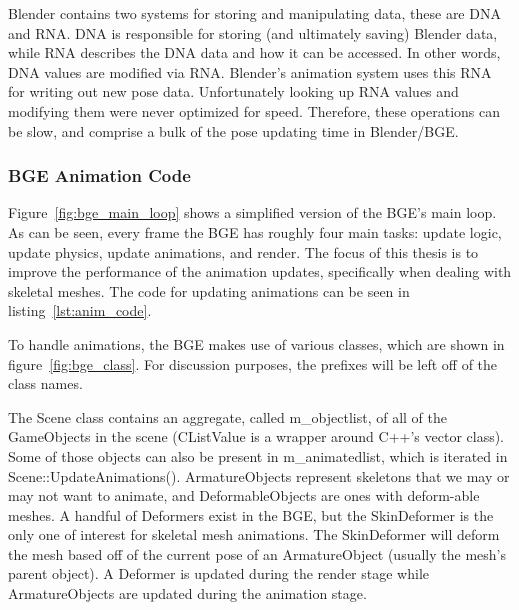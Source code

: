 Blender contains two systems for storing and manipulating data, these are DNA and RNA. DNA is responsible for storing (and ultimately saving) Blender data, while RNA describes the DNA data and how it can be accessed.
In other words, DNA values are modified via RNA.
Blender's animation system uses this RNA for writing out new pose data.
Unfortunately looking up RNA values and modifying them were never optimized for speed.
Therefore, these operations can be slow, and comprise a bulk of the pose updating time in Blender/BGE.


\subsubsection{BGE Animation Code}
\label{sec:bge_overview}


Figure~\ref{fig:bge_main_loop} shows a simplified version of the BGE's main loop.
As can be seen, every frame the BGE has roughly four main tasks: update logic, update physics, update animations, and render.
The focus of this thesis is to improve the performance of the animation updates, specifically when dealing with skeletal meshes.
The code for updating animations can be seen in listing~\ref{lst:anim_code}.


To handle animations, the BGE makes use of various classes, which are shown in figure~\ref{fig:bge_class}.
For discussion purposes, the prefixes will be left off of the class names.


The Scene class contains an aggregate, called m\_objectlist, of all of the GameObjects in the scene (CListValue is a wrapper around C++'s vector class).
Some of those objects can also be present in m\_animatedlist, which is iterated in Scene::UpdateAnimations().
ArmatureObjects represent skeletons that we may or may not want to animate, and DeformableObjects are ones with deform-able meshes.
A handful of Deformers exist in the BGE, but the SkinDeformer is the only one of interest for skeletal mesh animations.
The SkinDeformer will deform the mesh based off of the current pose of an ArmatureObject (usually the mesh's parent object).
A Deformer is updated during the render stage while ArmatureObjects are updated during the animation stage.

